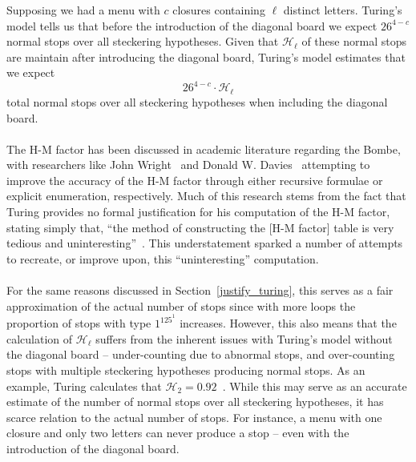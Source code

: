 \noindent Supposing we had a menu with $c$ closures containing $\ell$ distinct
letters. Turing's model tells us that before the introduction of the
diagonal board we expect $26^{4-c}$ normal stops over all steckering
hypotheses. Given that $\mathcal{H}_\ell$ of these normal stops are
maintain after introducing the diagonal board, Turing's model
estimates that we expect
\[
  26^{4-c}\cdot\mathcal{H}_\ell
\]
total normal stops over all steckering hypotheses when including the
diagonal board.
\\\\The H-M factor has been discussed in academic literature
regarding the Bombe, with researchers like John Wright~\cite{Wright2015} and Donald W. Davies~\cite{Davies2010} attempting to improve the accuracy of the H-M factor through
either recursive formulae or explicit enumeration, respectively. Much
of this research stems from the fact that Turing provides no formal
justification for his computation of the H-M factor, stating simply
that, ``the method of constructing the [H-M factor] table is very
tedious and uninteresting''~\cite[p.~116]{Turing1940ProfBook}. This understatement sparked a number of
attempts to recreate, or improve upon, this ``uninteresting'' computation.
\\\\For the same reasons discussed in Section~\ref{justify_turing},
this serves as a fair approximation of the actual number of stops
since with more loops the proportion of stops with type $1^125^1$
increases. However, this also means that the calculation of
$\mathcal{H}_\ell$ suffers from the inherent issues with Turing's model
without the diagonal board -- under-counting due to abnormal stops,
and over-counting stops with multiple steckering hypotheses producing
normal stops. As an example, Turing calculates that $\mathcal{H}_2 =
0.92$~\cite[p.~116]{Turing1940ProfBook}. While this may serve as an accurate estimate of the number of
normal stops over all steckering hypotheses, it has scarce relation
to the actual number of stops. For instance, a menu with one closure
and only two letters can never produce a stop -- even with the
introduction of the diagonal board.

